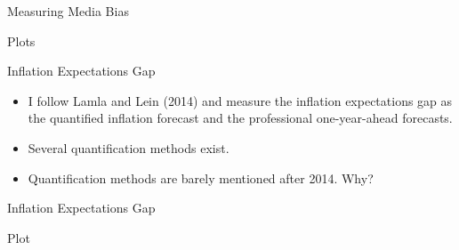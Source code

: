\documentclass[aspectratio=169,xcolor=dvipsnames]{beamer}
\begin{document}


\begin{frame}{Measuring Media Bias}

Plots

\end{frame}


\begin{frame}{Inflation Expectations Gap}

\begin{itemize}
\item I follow Lamla and Lein (2014) and measure the inflation expectations gap as the quantified inflation forecast and the professional one-year-ahead forecasts.
\item Several quantification methods exist. 
\item Quantification methods are barely mentioned after 2014. Why?
\end{itemize}

\end{frame}


\begin{frame}{Inflation Expectations Gap}

Plot

\end{frame}

\end{document}

